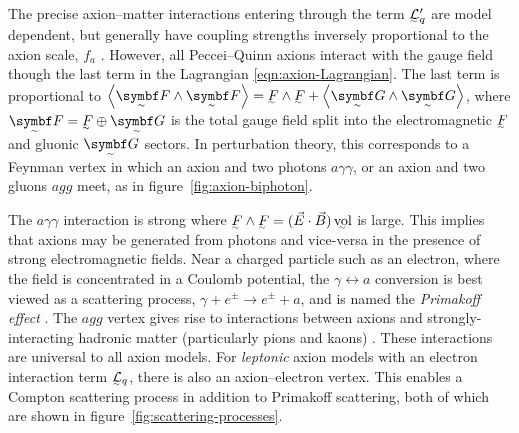 The precise axion--matter interactions entering through the term $\LL_q'$ are model dependent, but generally have coupling strengths inversely proportional to the axion scale, $f_a$ \cite{Duffy_2009}.
However, all Peccei--Quinn axions interact with the gauge field though the last term in the Lagrangian \eqref{eqn:axion-Lagrangian}.
The last term is proportional to $\angbr{\tsbm F\wedge\tsbm F} = \ts F\wedge\ts F + \angbr{\tsbm G\wedge\tsbm G}$, where $\tsbm F = \ts F \oplus \tsbm G$ is the total gauge field split into the electromagnetic $\ts F$ and gluonic $\tsbm G$ sectors.
In perturbation theory, this corresponds to a Feynman vertex in which an axion and two photons $aγγ$, or an axion and two gluons $agg$ meet, as in figure~\ref{fig:axion-biphoton}.

The $aγγ$ interaction is strong where $\ts F\wedge\ts F = (\vec E \cdot \vec B)\,\vol$ is large.
This implies that axions may be generated from photons and vice-versa in the presence of strong electromagnetic fields.
Near a charged particle such as an electron, where the field is concentrated in a Coulomb potential, the $γ \leftrightarrow a$ conversion is best viewed as a scattering process, $γ + e^\pm \to e^\pm + a$, and is named the \emph{Primakoff effect} \cite[§\,93.1.3]{ParticleDataGroup-review-2020}.
The $agg$ vertex gives rise to interactions between axions and strongly-interacting hadronic matter (particularly pions and kaons) \cite{Cadamuro_2011}.
These interactions are universal to all axion models.
For \emph{leptonic} axion models with an electron interaction term $\LL_q$, there is also an axion--electron vertex.
This enables a Compton scattering process in addition to Primakoff scattering, both of which are shown in figure~\ref{fig:scattering-processes}.

